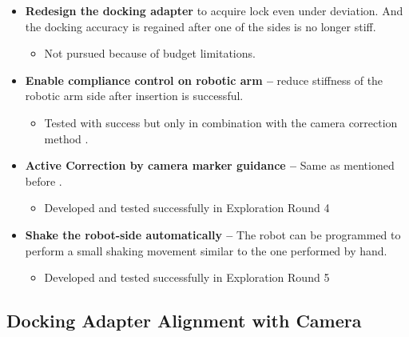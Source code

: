 \begin{itemize}
	\item \textbf{Redesign the docking adapter} to acquire lock even under deviation. And the docking accuracy is regained after one of the sides is no longer stiff.

\begin{itemize}
	\item Not pursued because of budget limitations.

\end{itemize}
	\item \textbf{Enable compliance control on robotic arm --} reduce stiffness of the robotic arm side after insertion is successful.

\begin{itemize}
	\item Tested with success but only in combination with the camera correction method .

\end{itemize}
	\item \textbf{Active Correction by camera marker guidance --} Same as mentioned before .

\begin{itemize}
	\item Developed and tested successfully in Exploration Round 4\\

\end{itemize}
	\item \textbf{Shake the robot-side automatically --} The robot can be programmed to perform a small shaking movement similar to the one performed by hand.

\begin{itemize}
	\item Developed and tested successfully in Exploration Round 5 

\end{itemize}
\end{itemize}

\subsection{Docking Adapter Alignment with Camera}
\label{subsection:exploration-3-docking-adapter-alignment-with-camera}

